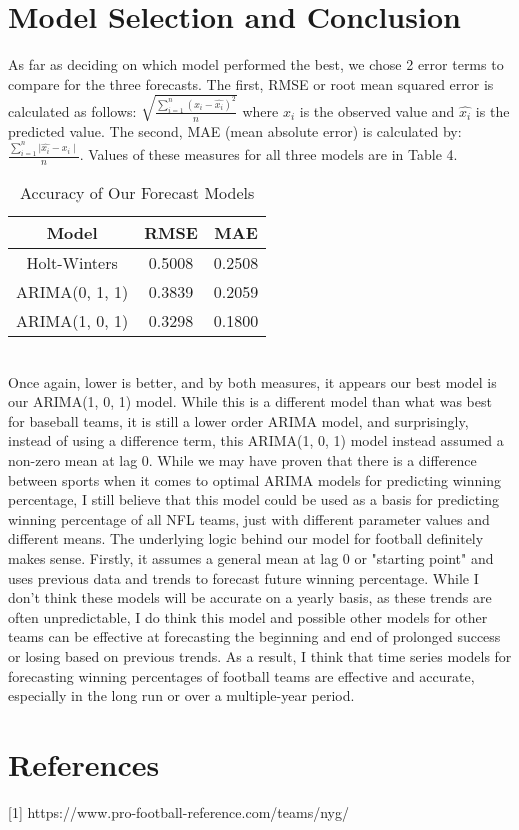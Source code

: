 \documentclass[12pt]{article}
\begin{document}
\section{Model Selection and Conclusion}\label{sec:chapter}
As far as deciding on which model performed the best, we chose 2 error terms to compare for the three forecasts. The first, RMSE or root mean squared error is calculated as follows: \(\sqrt{\frac{\sum_{i=1}^{n}{(x_i - \hat{x_i})^2}}{n}}\) where \(x_i\) is the observed value and \(\hat{x_i}\) is the predicted value. The second, MAE (mean absolute error) is calculated by: \(\frac{\sum_{i=1}^{n}{\mid \hat{x_i} - x_i \mid}}{n}\). Values of these measures for all three models are in Table 4.\\
\begin{table}[h]
\begin{center}
\begin{tabular}{ |c|c|c| } 
 \hline
 \textbf{Model} & \textbf{RMSE} & \textbf{MAE}\\
 \hline
 Holt-Winters & 0.5008 & 0.2508\\
 \hline
 ARIMA(0, 1, 1) & 0.3839 & 0.2059\\ 
 \hline
 ARIMA(1, 0, 1) & 0.3298 & 0.1800\\ 
 \hline
\end{tabular}
\caption{Accuracy of Our Forecast Models}
\label{table:Table 4}
\end{center}
\end{table}\\
Once again, lower is better, and by both measures, it appears our best model is our ARIMA(1, 0, 1) model. While this is a different model than what was best for baseball teams, it is still a lower order ARIMA model, and surprisingly, instead of using a difference term, this ARIMA(1, 0, 1) model instead assumed a non-zero mean at lag 0. While we may have proven that there is a difference between sports when it comes to optimal ARIMA models for predicting winning percentage, I still believe that this model could be used as a basis for predicting winning percentage of all NFL teams, just with different parameter values and different means. The underlying logic behind our model for football definitely makes sense. Firstly, it assumes a general mean at lag 0 or "starting point" and uses previous data and trends to forecast future winning percentage. While I don't think these models will be accurate on a yearly basis, as these trends are often unpredictable, I do think this model and possible other models for other teams can be effective at forecasting the beginning and end of prolonged success or losing based on previous trends. As a result, I think that time series models for forecasting winning percentages of football teams are effective and accurate, especially in the long run or over a multiple-year period.
\\

\section{References}\label{sec:chapter}
[1] https://www.pro-football-reference.com/teams/nyg/
\end{document}

